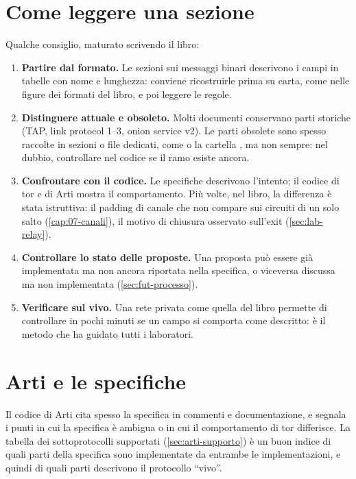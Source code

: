 \section{Come leggere una sezione}\label{sec:C-lettura}

Qualche consiglio, maturato scrivendo il libro:
\begin{enumerate}
  \item \textbf{Partire dal formato.} Le sezioni sui messaggi binari descrivono i campi in tabelle con nome e lunghezza: conviene ricostruirle prima su carta, come nelle figure dei formati del libro, e poi leggere le regole.
  \item \textbf{Distinguere attuale e obsoleto.} Molti documenti conservano parti storiche (TAP, link protocol 1--3, onion service v2). Le parti obsolete sono spesso raccolte in sezioni o file dedicati, come  o la cartella , ma non sempre: nel dubbio, controllare nel codice se il ramo esiste ancora.
  \item \textbf{Confrontare con il codice.} Le specifiche descrivono l'intento; il codice di tor e di Arti mostra il comportamento. Più volte, nel libro, la differenza è stata istruttiva: il padding di canale che non compare sui circuiti di un solo salto (\cref{cap:07-canali}), il motivo di chiusura osservato sull'exit (\cref{sec:lab-relay}).
  \item \textbf{Controllare lo stato delle proposte.} Una proposta può essere già implementata ma non ancora riportata nella specifica, o viceversa discussa ma non implementata (\cref{sec:fut-processo}).
  \item \textbf{Verificare sul vivo.} Una rete privata come quella del libro permette di controllare in pochi minuti se un campo si comporta come descritto: è il metodo che ha guidato tutti i laboratori.
\end{enumerate}

\section{Arti e le specifiche}\label{sec:C-arti}

Il codice di Arti cita spesso la specifica in commenti e documentazione, e segnala i punti in cui la specifica è ambigua o in cui il comportamento di tor differisce. La tabella dei sottoprotocolli supportati (\cref{sec:arti-supporto}) è un buon indice di quali parti della specifica sono implementate da entrambe le implementazioni, e quindi di quali parti descrivono il protocollo \enquote{vivo}.
